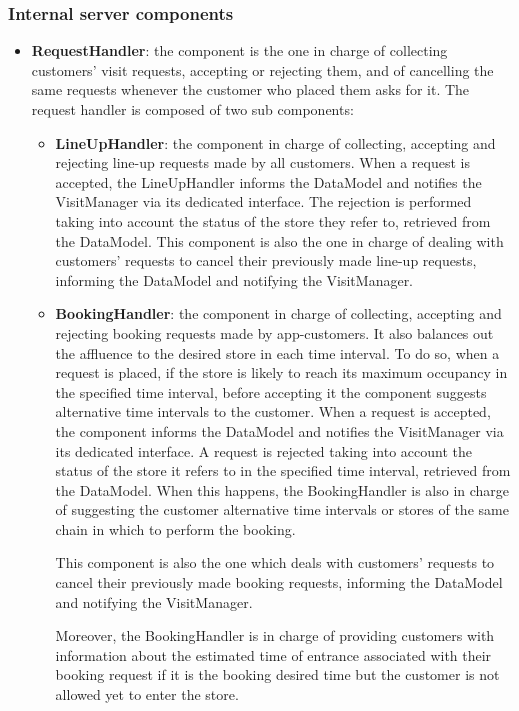 \documentclass[a4paper,oneside,11pt]{book}
\begin{document}
    \subsubsection{Internal server components}
    \begin{itemize}
        \item \textbf{RequestHandler}: the component is the one in charge of collecting customers’ visit requests, accepting or rejecting them, and of cancelling the same requests whenever the customer who placed them asks for it. The request handler is composed of two sub components:
        \begin{itemize}
            \item \textbf{LineUpHandler}: the component in charge of collecting, accepting and rejecting line-up requests made by all customers. When a request is accepted, the LineUpHandler informs the DataModel and notifies the VisitManager via its dedicated interface. The rejection is performed taking into account the status of the store they refer to, retrieved from the DataModel. This component is also the one in charge of dealing with customers’ requests to cancel their previously made line-up requests, informing the DataModel and notifying the VisitManager.
            \item \textbf{BookingHandler}: the component in charge of collecting, accepting and rejecting booking requests made by app-customers. It also balances out the affluence to the desired store in each time interval. To do so, when a request is placed, if the store is likely to reach its maximum occupancy in the specified time interval, before accepting it the component suggests alternative time intervals to the customer. When a request is accepted, the component informs the DataModel and notifies the VisitManager via its dedicated interface. A request is rejected taking into account the status of the store it refers to in the specified time interval, retrieved from the DataModel. When this happens, the BookingHandler is also in charge of suggesting the customer alternative time intervals or stores of the same chain in which to perform the booking. \par 
            This component is also the one which deals with customers’ requests to cancel their previously made booking requests, informing the DataModel and notifying the VisitManager. \par
            Moreover, the BookingHandler is in charge of providing customers with information about the estimated time of entrance associated with their booking request if it is the booking desired time but the customer is not allowed yet to enter the store.  

\end{itemize}
\end{itemize}
\end{document}
